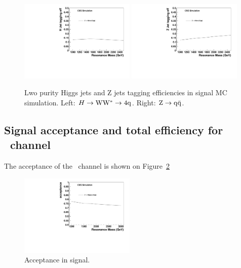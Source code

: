 \begin{figure}[htb]
\begin{center}
\includegraphics[width=0.49\textwidth]{EXO-14-009/HqqqqZqqfigs/Signal/H-taggingEff-8TeV-LowP.pdf}
\includegraphics[width=0.49\textwidth]{EXO-14-009/HqqqqZqqfigs/Signal/Z-taggingEff-8TeV-LowP.pdf}
\end{center}
\caption{
  Lwo purity Higgs jets and Z jets tagging efficiencies in signal MC simulation.
  Left: $H\to{\rm W}{\rm W}^*\to4{\rm q}$. Right: ${\rm Z}\to{\rm q\bar{q}}$.  }
\label{fig:LowPurity}
\end{figure}



\subsection{Signal acceptance and total efficiency for \HwwZqq\ channel}

The acceptance of the \HwwZqq\ channel is shown on Figure~\ref{fig:HwwAcc}

\begin{figure}[htb]
\begin{center}
\includegraphics[width=0.49\textwidth]{EXO-14-009/HqqqqZqqfigs/Signal/HqqqqZqq-signal-acc-8TeV.pdf}
\end{center}
\caption{
Acceptance in signal. 
}
\label{fig:HwwAcc}
\end{figure}

